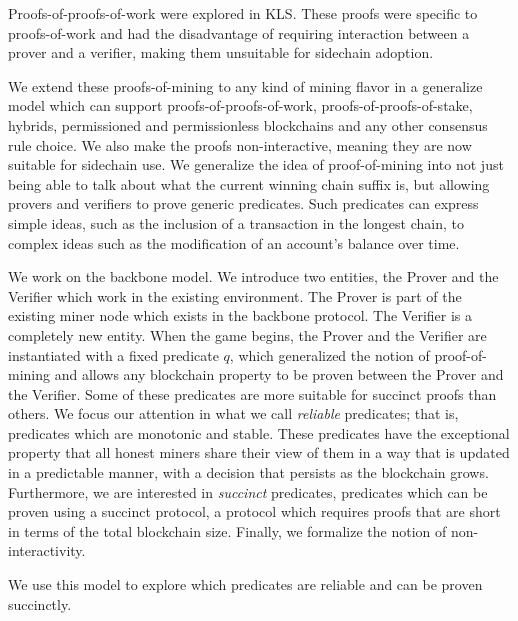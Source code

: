 Proofs-of-proofs-of-work were explored in KLS. These proofs were specific to
proofs-of-work and had the disadvantage of requiring interaction between a
prover and a verifier, making them unsuitable for sidechain adoption.

We extend these proofs-of-mining to any kind of mining flavor in a generalize
model which can support proofs-of-proofs-of-work, proofs-of-proofs-of-stake,
hybrids, permissioned and permissionless blockchains and any other consensus
rule choice. We also make the proofs non-interactive, meaning they are now
suitable for sidechain use. We generalize the idea of proof-of-mining into not
just being able to talk about what the current winning chain suffix is, but
allowing provers and verifiers to prove generic predicates. Such predicates can
express simple ideas, such as the inclusion of a transaction in the longest
chain, to complex ideas such as the modification of an account's balance over
time.

We work on the backbone model. We introduce two entities, the Prover and the
Verifier which work in the existing environment. The Prover is part of the
existing miner node which exists in the backbone protocol. The Verifier is a
completely new entity. When the game begins, the Prover and the Verifier are
instantiated with a fixed predicate $q$, which generalized the notion of
proof-of-mining and allows any blockchain property to be proven between the
Prover and the Verifier. Some of these predicates are more suitable for
succinct proofs than others. We focus our attention in what we call \textit{
reliable} predicates; that is, predicates which are monotonic and stable.
These predicates have the exceptional property that all honest miners share
their view of them in a way that is updated in a predictable manner, with a
decision that persists as the blockchain grows. Furthermore, we are interested
in \textit{succinct} predicates, predicates which can be proven using a
succinct protocol, a protocol which requires proofs that are short in terms of
the total blockchain size. Finally, we formalize the notion of
non-interactivity.

We use this model to explore which predicates are reliable and can be proven
succinctly.
